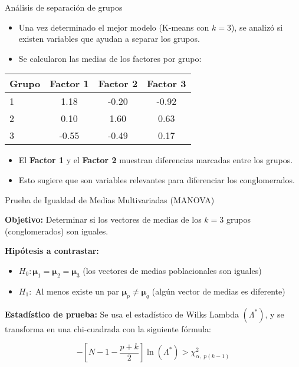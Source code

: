 \documentclass[
	11pt, %
]{beamer}
\begin{document}
\begin{frame}{Análisis de separación de grupos}
\begin{itemize}
    \item Una vez determinado el mejor modelo (K-means con $k=3$), se analizó si existen variables que ayudan a separar los grupos.
    \item Se calcularon las medias de los factores por grupo:
\end{itemize}
\begin{center}
\begin{tabular}{lccc}
\toprule
\textbf{Grupo} & \textbf{Factor 1} & \textbf{Factor 2} & \textbf{Factor 3} \\
\midrule
1 & 1.18 & -0.20 & -0.92 \\
2 & 0.10 &  1.60 &  0.63 \\
3 & -0.55 & -0.49 &  0.17 \\
\bottomrule
\end{tabular}
\end{center}
\vspace{0.3cm}
\begin{itemize}
    \item El \textbf{Factor 1} y el \textbf{Factor 2} muestran diferencias marcadas entre los grupos.
    \item Esto sugiere que son variables relevantes para diferenciar los conglomerados.
\end{itemize}
\end{frame}

\begin{frame}{Prueba de Igualdad de Medias Multivariadas (MANOVA)}

\textbf{Objetivo:} Determinar si los vectores de medias de los $k = 3$ grupos (conglomerados) son iguales.

\vspace{0.3cm}
\textbf{Hipótesis a contrastar:}
\begin{itemize}
    \item $H_0: \bm{\mu}_1 = \bm{\mu}_2 = \bm{\mu}_3$ (los vectores de medias poblacionales son iguales)
    \item $H_1:$ Al menos existe un par $\bm{\mu}_p \neq \bm{\mu}_q$ (algún vector de medias es diferente)
\end{itemize}

\vspace{0.3cm}
\textbf{Estadístico de prueba:} Se usa el estadístico de Wilks Lambda $(\Lambda^*)$, y se transforma en una chi-cuadrada con la siguiente fórmula:

\[
- \left[N - 1 - \frac{p + k}{2} \right] \ln(\Lambda^*) > \chi^2_{\alpha, \; p(k - 1)}
\]

\end{frame}
\end{document}
